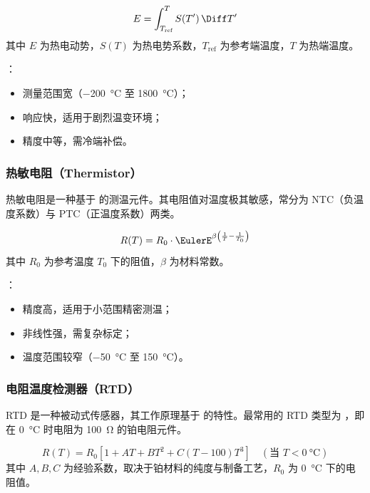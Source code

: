 \begin{equation}
E = \int_{T_\text{ref}}^{T} S(T')\, \Diff T'
\end{equation}
其中 $E$ 为热电动势，$S(T)$ 为热电势系数，$T_\text{ref}$ 为参考端温度，$T$ 为热端温度。

：
\begin{itemize}
\item 测量范围宽（\SI{-200}{\degreeCelsius} 至 \SI{1800}{\degreeCelsius}）；
\item 响应快，适用于剧烈温变环境；
\item 精度中等，需冷端补偿。
\end{itemize}

\subsubsection{热敏电阻（Thermistor）}

热敏电阻是一种基于  的测温元件。其电阻值对温度极其敏感，常分为 NTC（负温度系数）与 PTC（正温度系数）两类。

\begin{equation}
R(T) = R_0 \cdot \EulerE^{\beta \left( \frac{1}{T} - \frac{1}{T_0} \right)}
\end{equation}
其中 $R_0$ 为参考温度 $T_0$ 下的阻值，$\beta$ 为材料常数。

：
\begin{itemize}
\item 精度高，适用于小范围精密测温；
\item 非线性强，需复杂标定；
\item 温度范围较窄（\SI{-50}{\degreeCelsius} 至 \SI{150}{\degreeCelsius}）。
\end{itemize}

\subsubsection{电阻温度检测器（RTD）}

RTD 是一种被动式传感器，其工作原理基于  的特性。最常用的 RTD 类型为 ，即在 \SI{0}{\degreeCelsius} 时电阻为 \SI{100}{\ohm} 的铂电阻元件。

\begin{equation}
R(T) = R_0 [1 + A T + B T^2 + C (T - 100) T^3] \quad (\text{当 } T < \SI{0}{\degreeCelsius})
\end{equation}
其中 $A, B, C$ 为经验系数，取决于铂材料的纯度与制备工艺，$R_0$ 为 \SI{0}{\degreeCelsius} 下的电阻值。

